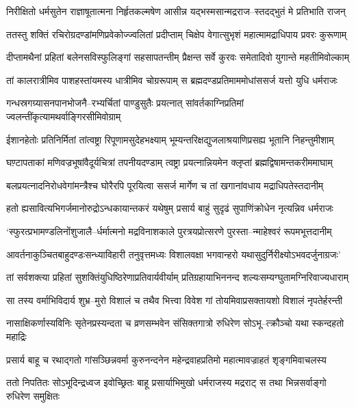 \twolineshloka
{निरीक्षितो धर्मसुतेन राज्ञाषूतात्मना निर्हृतकल्मषेण}
{आसीन्न यद्भस्मसान्मद्रराज--स्तदद्भुतं मे प्रतिभाति राजन्}


\twolineshloka
{ततस्तु शक्तिं रचिरोग्रदण्डांमणिप्रवेकोज्ज्वलितां प्रदीप्ताम्}
{चिक्षेप वेगात्सुभृशं महात्मामद्राधिपाय प्रवरः कुरूणाम्}


\twolineshloka
{दीप्तामथैनां प्रहितां बलेनसविस्फुलिङ्गां सहसापतन्तीम्}
{प्रैक्षन्त सर्वे कुरवः समेतादिवो युगान्ते महतीमिवोल्काम्}


\twolineshloka
{तां कालरात्रीमिव पाशहस्तांयमस्य धात्रीमिव चोग्ररूपाम्}
{स ब्रह्मदण्डप्रतिमाममोधांससर्ज यत्तो युधि धर्मराजः}


\twolineshloka
{गन्धस्रगग्र्यासनपानभोजनै--रभ्यर्चितां पाण्डुसुतैः प्रयत्नात्}
{सांवर्तकाग्निप्रतिमां ज्वलन्तींकृत्यामथर्वाङ्गिरसीमिवोग्राम्}


\twolineshloka
{ईशानहेतोः प्रतिनिर्मितां तांत्वष्ट्रा रिपूणामसुदेहभक्ष्याम्}
{भूम्यन्तरिक्षद्युजलाश्रयाणिप्रसह्य भूतानि निहन्तुमीशाम्}


\twolineshloka
{घण़्टापताकां मणिवज्रभूषांवैदूर्यचित्रां तपनीयदण्डाम्}
{त्वष्ट्रा प्रयत्नान्नियमेन क्लृप्तां ब्रह्मद्विषामन्तकरीममाघाम्}


\twolineshloka
{बलप्रयत्नादनिरोधवेगांमन्त्रैश्च घोरैरपि पूरयित्वा}
{ससर्ज मार्गेण च तां खगानांवधाय मद्राधिपतेस्तदानीम्}


\twolineshloka
{हतो ह्यसावित्यभिगर्जमानोरुद्रोऽन्धकायान्तकरं यथेषुम्}
{प्रसार्य बाहुं सुदृढं सुपाणिंक्रोधेन नृत्यन्निव धर्मराजः}


\twolineshloka
{`स्फुरत्प्रभामण्डलिनोंशुजालै--र्धर्मात्मनो मद्रविनाशकाले}
{पुरत्रयप्रोत्सरणे पुरस्ता--न्माहेश्वरं रूपमभूत्तदानीम्}


\twolineshloka
{आवर्तनाकुञ्चितबाहुदण्डःसन्ध्याविहारी तनुवृत्तमध्यः}
{विशालवक्षा भगवान्हरो यथासुदुर्निरीक्ष्योऽभवदर्जुनाग्रजः'}


\twolineshloka
{तां सर्वशक्त्या प्रहितां सुशक्तिंयुधिष्ठिरेणाप्रतिवार्यवीर्याम्}
{प्रतिग्रहायाभिननन्द शल्यःसम्यग्घुतामग्निरिवाज्यधाराम्}


\twolineshloka
{सा तस्य वर्माभिविदार्य शुभ्र--मुरो विशालं च तथैव भित्त्वा}
{विवेश गां तोयमिवाप्रसक्तायशो विशालं नृपतेर्हरन्ती}


\twolineshloka
{नासाक्षिकर्णास्यविनिः सृतेनप्रस्यन्दता च व्रणसम्भवेन}
{संसिक्तगात्रो रुधिरेण सोऽभू--त्क्रौञ्चो यथा स्कन्दहतो महाद्रिः}


\twolineshloka
{प्रसार्य बाहू च रथाद्गतो गांसञ्छिन्नवर्मा कुरुनन्दनेन}
{महेन्द्रवाहप्रतिमो महात्मावज्राहतं शृङ्गमिवाचलस्य}


\threelineshloka
{ततो निपतितः सोऽभूदिन्द्रध्वज इवोच्छ्रितः}
{बाहू प्रसार्याभिमुखो धर्मराजस्य मद्रराट्}
{स तथा भिन्नसर्वाङ्गो रुधिरेण समुक्षितः}


